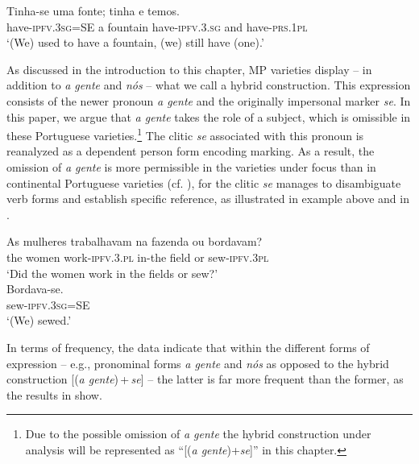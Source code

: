 \documentclass[output=paper]{langscibook}
\begin{document}
\ea\label{ex:henriques:12}
 \gll Tinha-se uma fonte; tinha e temos.\\
         have-\textsc{ipfv.3sg=SE} a fountain have-\textsc{ipfv.3.sg} and have-\textsc{prs.1pl}\\
 \glt `(We) used to have a fountain, (we) still have (one).'
\z 

As discussed in the introduction to this chapter, MP varieties display  -- in addition to \textit{a} \textit{gente} and \textit{nós} --  what we call a hybrid construction. This  expression consists of the newer pronoun \textit{a gente} and the originally impersonal marker \textit{se}. In this paper, we argue that \textit{a gente} takes the role of a  subject, which is omissible in these Portuguese varieties.\footnote{Due to the possible omission of \textit{a gente} the hybrid construction under analysis will be represented as “[(\textit{a gente})+\textit{se}]” in this chapter.} The clitic \textit{se} associated with this pronoun is reanalyzed as a dependent person form encoding  marking. As a result, the omission of \textit{a gente} is more permissible in the varieties under focus than in continental Portuguese varieties (cf. \citealt{Pereira2003, Posio2012}), for the clitic \textit{se} manages to disambiguate  verb forms and establish  specific reference, as illustrated in example  above and in .

\ea\label{ex:henriques:13}
 \begin{xlist}
  \gll As mulheres trabalhavam na  fazenda ou bordavam?\\
     the women work-\textsc{ipfv.3.pl} in-the field or sew-\textsc{ipfv.3pl}\\
 \glt`Did the women work in the fields or sew?'\\
    \gll Bordava-se.\\
         sew-\textsc{ipfv.3sg}=SE\\
 \glt  `(We) sewed.'
 \end{xlist}
\z 

In terms of frequency, the data indicate that within the different forms of  expression  -- e.g., pronominal forms \textit{a gente} and \textit{nós} as opposed to the hybrid construction [(\textit{a gente})\,+\,\textit{se}] --  the latter is far more frequent than the former, as the results in  show.
\end{document}
